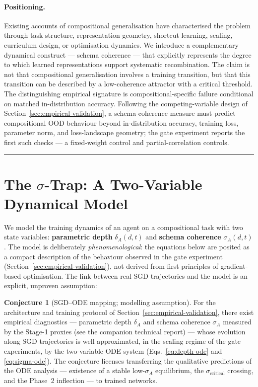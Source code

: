 \documentclass{article}
\theoremstyle{definition}
\newtheorem{conjecture}{Conjecture}
\begin{document}
\paragraph{Positioning.}
Existing accounts of compositional generalisation have characterised
the problem through task structure, representation geometry, shortcut
learning, scaling, curriculum design, or optimisation dynamics. We
introduce a complementary dynamical construct --- schema coherence ---
that explicitly represents the degree to which learned representations
support systematic recombination. The claim is not that compositional
generalisation involves a training transition, but that this transition
can be described by a low-coherence attractor with a critical threshold.
The distinguishing empirical signature is compositional-specific failure
conditional on matched in-distribution accuracy. Following the
competing-variable design of Section~\ref{sec:empirical-validation}, a
schema-coherence measure must predict compositional OOD behaviour beyond
in-distribution accuracy, training loss, parameter norm, and
loss-landscape geometry; the gate experiment reports the first such
checks --- a fixed-weight control and partial-correlation controls.

\noindent\rule{\linewidth}{0.4pt}

\section{The $\sigma$-Trap: A Two-Variable Dynamical Model}\label{sec:core-framework}

We model the training dynamics of an agent on a compositional task with
two state variables: \textbf{parametric depth} $\delta_A(d,t)$ and
\textbf{schema coherence} $\sigma_A(d,t)$. The model is deliberately
\emph{phenomenological}: the equations below are posited as a compact
description of the behaviour observed in the gate experiment
(Section~\ref{sec:empirical-validation}), not derived from first
principles of gradient-based optimisation. The link between real SGD
trajectories and the model is an explicit, unproven assumption:

\begin{conjecture}[SGD--ODE mapping; modelling assumption]
\label{conj:sgd-ode}
For the architecture and training protocol of
Section~\ref{sec:empirical-validation}, there exist empirical
diagnostics --- parametric depth $\delta_A$ and schema coherence
$\sigma_A$ measured by the Stage-1 proxies (see the companion technical
report) --- whose evolution along SGD trajectories is well approximated,
in the scaling regime of the gate experiments, by the two-variable ODE
system (Eqs.~\eqref{eq:depth-ode} and \eqref{eq:sigma-ode}). The
conjecture licenses transferring the qualitative predictions of the ODE
analysis --- existence of a stable low-$\sigma_A$ equilibrium, the
$\sigma_{\text{critical}}$ crossing, and the Phase~2 inflection --- to
trained networks.
\end{conjecture}
\end{document}
